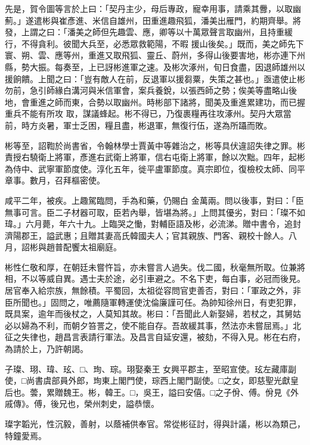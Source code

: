 \begin{pinyinscope}
 先是，賀令圖等言於上曰：「契丹主少，母后專政，寵幸用事，請乘其釁，以取幽薊。」遂遣彬與崔彥進、米信自雄州，田重進趣飛狐，潘美出雁門，約期齊舉。將發，上謂之曰：「潘美之師但先趣雲、應，卿等以十萬眾聲言取幽州，且持重緩行，不得貪利。彼聞大兵至，必悉眾救範陽，不暇
 援山後矣。」既而，美之師先下寰、朔、雲、應等州，重進又取飛狐、靈丘、蔚州，多得山後要害地，彬亦連下州縣，勢大振。每奏至，上已訝彬進軍之速。及彬次涿州，旬日食盡，因退師雄州以援餉饋。上聞之曰：「豈有敵人在前，反退軍以援芻粟，失策之甚也。」亟遣使止彬勿前，急引師緣白溝河與米信軍會，案兵養銳，以張西師之勢；俟美等盡略山後地，會重進之師而東，合勢以取幽州。時彬部下諸將，聞美及重進累建功，而已握重兵不能有所攻
 取，謀議蜂起。彬不得已，乃復裹糧再往攻涿州。契丹大眾當前，時方炎暑，軍士乏困，糧且盡，彬退軍，無復行伍，遂為所躡而敗。



 彬等至，詔鞫於尚書省，令翰林學士賈黃中等雜治之，彬等具伏違詔失律之罪。彬責授右驍衛上將軍，彥進右武衛上將軍，信右屯衛上將軍，餘以次黜。四年，起彬為侍中、武寧軍節度使。淳化五年，徙平盧軍節度。真宗即位，復檢校太師、同平章事。數月，召拜樞密使。



 咸平二年，被疾。上趣駕臨問，手為和藥，仍賜白
 金萬兩。問以後事，對曰：「臣無事可言。臣二子材器可取，臣若內舉，皆堪為將。」上問其優劣，對曰：「璨不如瑋。」六月薨，年六十九。上臨哭之慟，對輔臣語及彬，必流涕。贈中書令，追封濟陽郡王，謚武惠；且贈其妻高氏韓國夫人；官其親族、門客、親校十餘人。八月，詔彬與趙普配饗太祖廟庭。



 彬性仁敬和厚，在朝廷未嘗忤旨，亦未嘗言人過失。伐二國，秋毫無所取。位兼將相，不以等威自異。遇士夫於途，必引車避之。不名下吏，每白事，必冠而後見。
 居官奉入給宗族，無餘積。平蜀回，太祖從容問官吏善否，對曰：「軍政之外，非臣所聞也。」固問之，唯薦隨軍轉運使沈倫廉謹可任。為帥知徐州日，有吏犯罪，既具案，逾年而後杖之，人莫知其故。彬曰：「吾聞此人新娶婦，若杖之，其舅姑必以婦為不利，而朝夕笞詈之，使不能自存。吾故緩其事，然法亦未嘗屈焉。」北征之失律也，趙昌言表請行軍法。及昌言自延安還，被劾，不得入見。彬在右府，為請於上，乃許朝謁。



 子璨、珝、瑋、玹、□、珣、琮。珝娶秦王
 女興平郡主，至昭宣使。玹左藏庫副使，□尚書虞部員外郎，珣東上閣門使，琮西上閣門副使。□之女，即慈聖光獻皇后也。蕓，累贈魏王。彬，韓王。□，吳王，謚曰安僖。□之子佾、傅。佾見《外戚傳》。傅，後兄也，榮州刺史，謚恭懷。



 璨字韜光，性沉毅，善射，以蔭補供奉官。常從彬征討，得與計議，彬以為類己，特鐘愛焉。




\end{pinyinscope}
